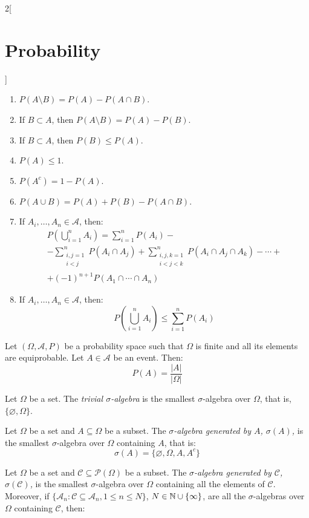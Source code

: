\documentclass[../../../main.tex]{subfiles}
\begin{document}
\begin{multicols}{2}[\section{Probability}]
\begin{prop}
\begin{enumerate}
      \item $P(A\setminus B) =P(A)-P(A\cap B)$.
      \item If $B\subset A$, then $P(A\setminus B)=P(A)-P(B)$.
      \item If $B\subset A$, then $P(B)\leq P(A)$.
      \item $P(A)\leq 1$.
      \item $P(A^c)=1-P(A)$.
      \item $P(A\cup B) =P(A)+P(B)-P(A\cap B)$.
      \item If $A_i,\ldots,A_n\in\mathcal{A}$, then:
            \begin{multline*}
              P\left(\bigcup_{i=1}^n A_i\right)=\sum_{i=1}^n P(A_i)-\\-\sum_{\substack{i,j=1\\i<j}}^nP(A_i\cap A_j)+\sum_{\substack{i,j,k=1\\i<j<k}}^nP(A_i\cap A_j\cap A_k)-\cdots+\\+{(-1)}^{n+1}P(A_1\cap\cdots\cap A_n)
            \end{multline*}
      \item If $A_i,\ldots,A_n\in\mathcal{A}$, then: $$P\left(\bigcup_{i=1}^n A_i\right)\leq\sum_{i=1}^n P(A_i)$$
    \end{enumerate}
  \end{prop}
  \begin{prop}
    Let $(\Omega,\mathcal{A},P)$ be a probability space such that $\Omega$ is finite and all its elements are equiprobable. Let $A\in\mathcal{A}$ be an event. Then: $$P(A)=\frac{|A|}{|\Omega|}$$
  \end{prop}
  \begin{definition}
    Let $\Omega$ be a set. The \textit{trivial $\sigma$-algebra} is the smallest $\sigma$-algebra over $\Omega$, that is, $\{\varnothing,\Omega\}$.
  \end{definition}
  \begin{definition}
    Let $\Omega$ be a set and $A\subseteq\Omega$ be a subset. The \textit{$\sigma$-algebra generated by $A$, $\sigma(A)$,} is the smallest $\sigma$-algebra over $\Omega$ containing $A$, that is: $$\sigma(A)=\{\varnothing,\Omega,A,A^c\}$$
  \end{definition}
  \begin{definition}
    Let $\Omega$ be a set and $\mathcal{C}\subseteq\mathcal{P}(\Omega)$ be a subset. The \textit{$\sigma$-algebra generated by $\mathcal{C}$, $\sigma(\mathcal{C})$,} is the smallest $\sigma$-algebra over $\Omega$ containing all the elements of $\mathcal{C}$. Moreover, if $\{\mathcal{A}_n:\mathcal{C}\subseteq\mathcal{A}_n,1\leq n\leq N\}$, $N\in\mathbb{N}\cup\{\infty\}$, are all the $\sigma$-algebras over $\Omega$ containing $\mathcal{C}$, then:

\end{definition}
\end{multicols}
\end{document}
